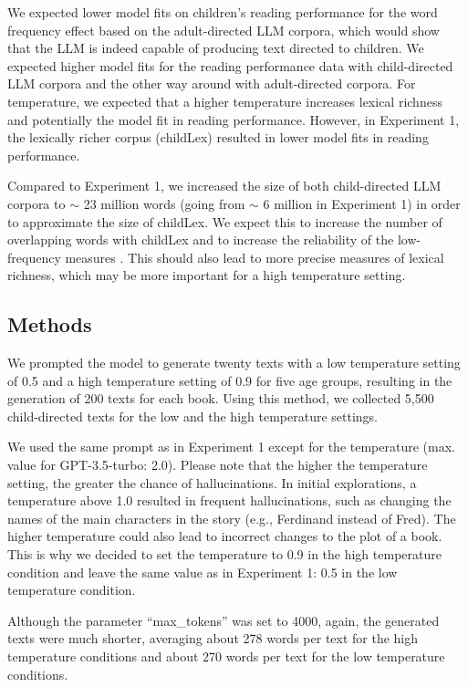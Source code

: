 \documentclass[doc, a4paper]{apa7}
\begin{document}
We expected lower model fits on children's reading performance for the word frequency effect based on the adult-directed LLM corpora, which would show that the LLM is indeed capable of producing text directed to children. We expected higher model fits for the reading performance data with child-directed LLM corpora and the other way around with adult-directed corpora. For temperature, we expected that a higher temperature increases lexical richness and potentially the model fit in reading performance. However, in Experiment 1, the lexically richer corpus (childLex) resulted in lower model fits in reading performance.  

Compared to Experiment 1, we increased the size of both child-directed LLM corpora to $\sim$ 23 million words (going from $\sim$ 6 million in Experiment 1) in order to approximate the size of childLex. We expect this to increase the number of overlapping words with childLex and to increase the reliability of the low-frequency measures \citep{gernsbacher_resolving_1984}. This should also lead to more precise measures of lexical richness, which may be more important for a high temperature setting. 


\subsection{Methods}

We prompted the model to generate twenty texts with a low temperature setting of 0.5 and a high temperature setting of 0.9 for five age groups, resulting in the generation of 200 texts for each book. Using this method, we collected 5,500 child-directed texts for the low and the high temperature settings. 

We used the same prompt as in Experiment 1 except for the temperature (max. value for GPT-3.5-turbo: 2.0). Please note that the higher the temperature setting, the greater the chance of hallucinations. In initial explorations, a temperature above 1.0 resulted in frequent hallucinations, such as changing the names of the main characters in the story (e.g., Ferdinand instead of Fred). The higher temperature could also lead to incorrect changes to the plot of a book. This is why we decided to set the temperature to 0.9 in the high temperature condition and leave the same value as in Experiment 1: 0.5 in the low temperature condition. 

Although the parameter “max\_tokens” was set to 4000, again, the generated texts were much shorter, averaging about 278 words per text for the high temperature conditions and about 270 words per text for the low temperature conditions. 
\end{document}
